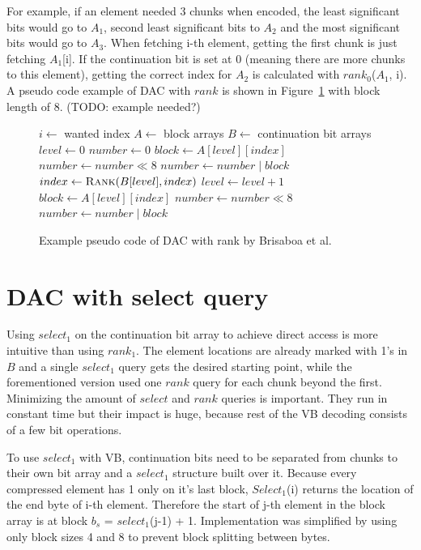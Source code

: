 For example, if an element needed 3 chunks when encoded, the least significant bits would go to $A_1$, second least significant bits to $A_2$ and the most significant 
bits would go to $A_3$. When fetching i-th element, getting the first chunk is just fetching $A_1$[i]. If the continuation bit is set at 0 (meaning there are more chunks 
to this element), getting the correct index for $A_2$ is calculated with $rank_0$($A_1$, i). A pseudo code example of DAC with $rank$ is shown in Figure~\ref{bris_pseudo} 
with block length of 8. (TODO: example needed?)


\begin{figure}[ht]
\begin{algorithmic}
\State $i \gets $ wanted index
\State $A \gets $ block arrays
\State $B \gets $ continuation bit arrays
\State $level \gets 0$
\State $number \gets 0$
\State $block \gets A[level][index]$
\State $number \gets number \mathbin{\ll} 8$
\State $number \gets number \mathbin{|} block$
\State $index \gets \Call{Rank}{B[level], index}$
\State $level \gets level + 1$
\EndWhile
\State $block \gets A[level][index]$
\State $number \gets number \mathbin{\ll} 8$
\State $number \gets number \mathbin{|} block$
\end{algorithmic}
\caption{Example pseudo code of DAC with rank by Brisaboa et al.} \label{bris_pseudo}
\end{figure}


\chapter{DAC with select query}

Using $select_1$ on the continuation bit array to achieve direct access is more intuitive than using $rank_1$. The element locations are already marked with 1's 
in $B$ and a single $select_1$ query gets the desired starting point, while the forementioned version \citep{Bri09} used one $rank$ query for each chunk beyond 
the first. Minimizing the amount of $select$ and $rank$ queries is important. They run in constant time but their impact is huge, because rest of the VB decoding 
consists of a few bit operations. 

To use $select_1$ with VB, continuation bits need to be separated from chunks to their own bit array and a $select_1$ structure built over it. Because every compressed element has 1
only on it's last block, $Select_1$(i) returns the location of the end byte of i-th element. Therefore the start of j-th element in the block array is at 
block $b_s$ = $select_1$(j-1) + 1. Implementation was simplified by using only block sizes 4 and 8 to prevent block splitting between bytes.

